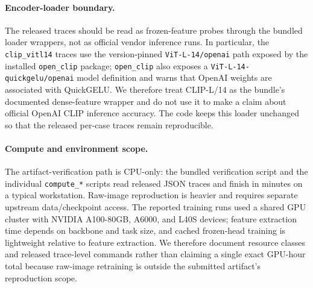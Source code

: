 \paragraph{Encoder-loader boundary.}
The released traces should be read as frozen-feature probes through the bundled
loader wrappers, not as official vendor inference runs. In particular, the
\texttt{clip\_vitl14} traces use the version-pinned
\texttt{ViT-L-14/openai} path exposed by the installed \texttt{open\_clip}
package; \texttt{open\_clip} also exposes a
\texttt{ViT-L-14-quickgelu/openai} model definition and warns that OpenAI
weights are associated with QuickGELU. We therefore treat CLIP-L/14 as the
bundle's documented dense-feature wrapper and do not use it to make a
claim about official OpenAI CLIP inference accuracy. The code keeps this loader
unchanged so that the released per-case traces remain reproducible.

\paragraph{Compute and environment scope.}
The artifact-verification path is CPU-only: the bundled verification script and the
individual \texttt{compute\_*} scripts read released JSON traces and finish in
minutes on a typical workstation. Raw-image reproduction is heavier and requires
separate upstream data/checkpoint access. The reported training runs used a
shared GPU cluster with NVIDIA A100-80GB, A6000, and L40S devices; feature
extraction time depends on backbone and task size, and cached frozen-head
training is lightweight relative to feature extraction. We therefore document
resource classes and released trace-level commands rather than claiming a single
exact GPU-hour total because raw-image retraining is outside the submitted
artifact's reproduction scope.

